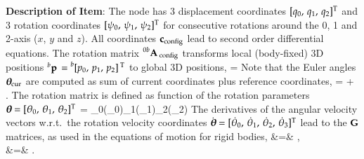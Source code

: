\finishTable
{\bf Description of Item}:
 \noindent
    The node has 3 displacement coordinates $[q_0,\,q_1,\,q_2]^\mathrm{T}$ and 3 rotation coordinates $[\psi_0,\,\psi_1,\,\psi_2]^\mathrm{T}$ for consecutive rotations around the 0, 1 and 2-axis ($x$, $y$ and $z$).
    All coordinates $\mathbf{c}_\mathrm{config}$ lead to second order differential equations.
    The rotation matrix $\prescript{0b}{}{\mathbf{A}}\,_\mathrm{config}$ transforms local (body-fixed) 3D positions $\prescript{b}{}{\mathbf{p}}\, = \prescript{b}{}{[p_0,\,p_1,\,p_2]}\,^\mathrm{T}$ to global 3D positions,
    \be
      \cConfig = \cConfig {} 
    \ee
    Note that the Euler angles $\mbox{\boldmath $\theta$ \unboldmath}\!\!_\mathrm{cur}$ are computed as sum of current coordinates plus reference coordinates,
    \be
      \ttheta\cCur = \tpsi\cCur + \tpsi\cRef.
    \ee
    The rotation matrix is defined as function of the rotation parameters $\mbox{\boldmath $\theta$ \unboldmath}\!\!=[\theta_0,\,\theta_1,\,\theta_2]^\mathrm{T}$
    \be
       = \Rot_0(\theta_0)\Rot_1(\theta_1)\Rot_2(\theta_2)
    \ee
    The derivatives of the angular velocity vectors w.r.t.\ the rotation velocity coordinates $\dot {\mbox{\boldmath $\theta$ \unboldmath}\!\!}=[\dot \theta_0,\,\dot \theta_1,\,\dot \theta_2,\,\dot \theta_3]^\mathrm{T}$ lead to the $\mathbf{G}$ matrices, as used in the equations of motion for rigid bodies,
    \bea
       &=&  \dot \ttheta, \\
       &=&  \dot \ttheta.
    \eea
\newpage

